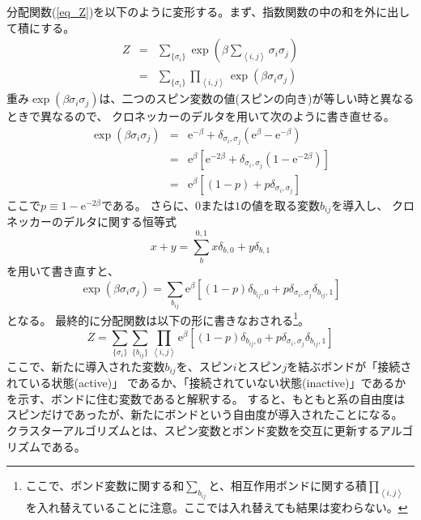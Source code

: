 \documentclass{jarticle}
\begin{document}
分配関数(\ref{eq_Z})を以下のように変形する。まず、指数関数の中の和を外に出して積にする。
\begin{eqnarray}
  Z &=& \sum_{\{\sigma_i\}} \exp\left(\beta \sum_{\left<i, j\right>} \sigma_i \sigma_j \right) \\
  &=&  \sum_{\{\sigma_i\}} \prod_{\left<i, j\right>}  \exp\left(\beta \sigma_i \sigma_j \right)
\end{eqnarray}
重み$\exp (\beta \sigma_i \sigma_j)$は、二つのスピン変数の値(スピンの向き)が等しい時と異なるときで異なるので、
クロネッカーのデルタを用いて次のように書き直せる。
\begin{eqnarray}
  \exp (\beta \sigma_i \sigma_j) &=& \mathrm{e}^{-\beta} + \delta_{\sigma_i, \sigma_j} \left( \mathrm{e}^{\beta} - \mathrm{e}^{-\beta}  \right)   \\
  &=&  \mathrm{e}^{\beta} \left[\mathrm{e}^{-2\beta}  +  \delta_{\sigma_i, \sigma_j}(1 - \mathrm{e}^{-2\beta}) \right] \\
  &=& \mathrm{e}^{\beta} \left[(1-p) +  p \delta_{\sigma_i, \sigma_j} \right]
\end{eqnarray}
ここで$p \equiv 1 - \mathrm{e}^{-2 \beta} $である。
さらに、$0$または$1$の値を取る変数$b_{ij}$を導入し、
クロネッカーのデルタに関する恒等式
\begin{equation}
  x + y = \sum_b^{0,1} x \delta_{b,0} + y \delta_{b,1}
\end{equation}
を用いて書き直すと、
\begin{equation}
  \exp (\beta \sigma_i \sigma_j) =
  \sum_{b_{ij}}  \mathrm{e}^{\beta} \left[(1-p) \delta_{b_{ij},0} +  p \delta_{\sigma_i, \sigma_j} \delta_{b_{ij},1} \right]
\end{equation}
となる。
最終的に分配関数は以下の形に書きなおされる\footnote{
  ここで、ボンド変数に関する和$\sum_{b_{ij}}$と、相互作用ボンドに関する積$\prod_{\left<i,j \right>}$を入れ替えていることに注意。ここでは入れ替えても結果は変わらない。}。
\begin{equation}
  Z =  \sum_{\{\sigma_i\}} \sum_{\{b_{ij}\}}  \prod_{\left<i, j\right>}   \mathrm{e}^{\beta} \left[(1-p) \delta_{b_{ij},0} +  p \delta_{\sigma_i, \sigma_j} \delta_{b_{ij},1} \right]
\end{equation}
ここで、新たに導入された変数$b_{ij}$を、スピン$i$とスピン$j$を結ぶボンドが「接続されている状態(active)」
であるか、「接続されていない状態(inactive)」であるかを示す、ボンドに住む変数であると解釈する。
すると、もともと系の自由度はスピンだけであったが、新たにボンドという自由度が導入されたことになる。
クラスターアルゴリズムとは、スピン変数とボンド変数を交互に更新するアルゴリズムである。
\end{document}
